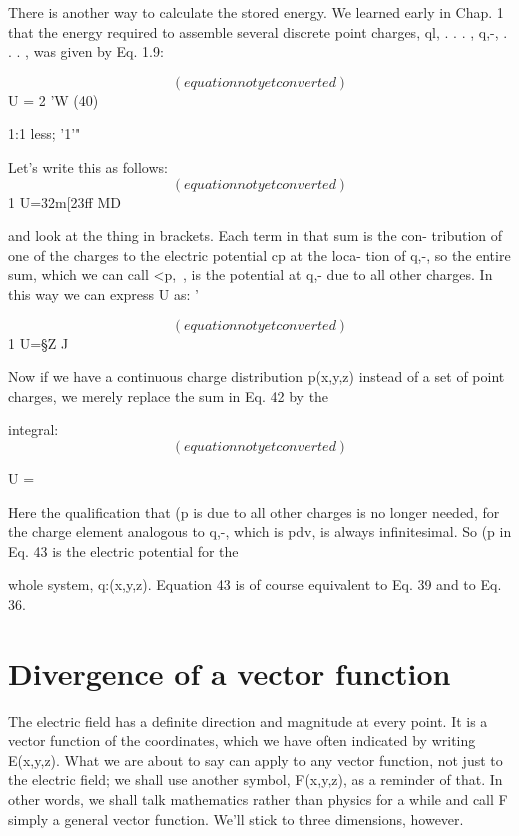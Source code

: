 There is another way to calculate the stored energy. We learned
early in Chap. 1 that the energy required to assemble several discrete
point charges, ql, . . . , q,-, . . . , was given by Eq. 1.9:

\begin{equation}
(equation not yet converted)
\end{equation}
U =  2 'W (40)

1:1 less; '1'"

Let's write this as follows:
\begin{equation}
(equation not yet converted)
\end{equation}
1
U=32m[23ff MD

and look at the thing in brackets. Each term in that sum is the con-
tribution of one of the charges to the electric potential cp at the loca-
tion of q,-, so the entire sum, which we can call <p,~, is the potential at
q,- due to all other charges. In this way we can express U as: '

\begin{equation}
(equation not yet converted)
\end{equation}
1
U=§Z%
J

Now if we have a continuous charge distribution p(x,y,z) instead of
a set of point charges, we merely replace the sum in Eq. 42 by the

integral:
\begin{equation}
(equation not yet converted)
\end{equation}

U = %

Here the qualification that (p is due to all other charges is no longer
needed, for the charge element analogous to q,-, which is pdv, is
always infinitesimal. So (p in Eq. 43 is the electric potential for the

whole system, q:(x,y,z). Equation 43 is of course equivalent to
Eq. 39 and to Eq. 36.

\section{Divergence of a vector function}

The electric field has a definite direction and magnitude at every
point. It is a vector function of the coordinates, which we have often
indicated by writing E(x,y,z). What we are about to say can apply
to any vector function, not just to the electric field; we shall use
another symbol, F(x,y,z), as a reminder of that. In other words, we
shall talk mathematics rather than physics for a while and call F
simply a general vector function. We'll stick to three dimensions,
however.

